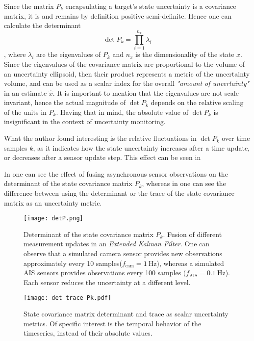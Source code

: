 Since the matrix $P_k$ encapsulating a target's state uncertainty is a covariance matrix, it is and remains by definition positive semi-definite. Hence one can calculate the determinant $$\det{P_k} = \prod_{i=1}^{n_x} \lambda_i$$ , where $\lambda_i$ are the eigenvalues of $P_k$ and $n_x$ is the dimensionality of the state $x$. Since the eigenvalues of the covariance matrix are proportional to the volume of an uncertainty ellipsoid, then their product represents a metric of the uncertainty volume, and can be used as a scalar index for the overall \textit{"amount of uncertainty"} in an estimate $\hat{x}$. It is important to mention that the eigenvalues are not scale invariant, hence the actual magnitude of $\det{P_k}$ depends on the relative scaling of the units in $P_k$. Having that in mind, the absolute value of $\det{P_k}$ is insignificant in the context of uncertainty monitoring. 

What the author found interesting is the relative fluctuations in $\det{P_k}$ over time samples $k$, as it indicates how the state uncertainty increases after a time update, or decreases after a sensor update step. This effect can be seen in 

In  one can see the effect of fusing asynchronous sensor observations on the determinant of the state covariance matrix $P_k$, whereas in  one can see the difference between using the determinant or the trace of the state covariance matrix as an uncertainty metric.



\begin{figure}
	\centering
	\texttt{[image: detP.png]}
	\caption{Determinant of the state covariance matrix $P_k$. Fusion of different measurement updates in an \emph{Extended Kalman Filter}. One can observe that a simulated camera sensor provides new observations approximately every 10 samples($f_{\text{cam}} = \SI{1}{\Hz}$), whereas a simulated AIS sensors provides observations every 100 samples ($f_{\text{AIS}} = \SI{0.1}{\Hz}$). Each sensor reduces the uncertainty at a different level.}
	\label{fig:detp}
\end{figure}

\begin{figure}
	\centering
	\texttt{[image: det\_trace\_Pk.pdf]}
	\caption{State covariance matrix determinant and trace as scalar uncertainty metrics. Of specific interest is the temporal behavior of the timeseries, instead of their absolute values.}
	\label{fig:dettracepk}
\end{figure}


